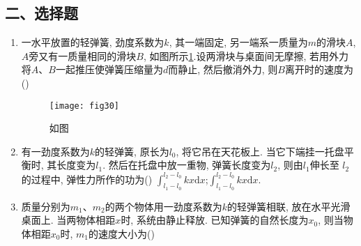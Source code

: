 \subsection*{二、选择题}
\begin{enumerate}
    \item 一水平放置的轻弹簧, 劲度系数为$k$, 其一端固定, 另一端系一质量为$m$的滑块$A$, 
    $A$旁又有一质量相同的滑块$B$, 如图所示\ref{fig:30}.设两滑块与桌面间无摩擦, 若用外力将$A$、$B$一起推压使弹簧压缩量为$d$而静止, 然后撤消外力, 则$B$离开时的速度为(\hspace{1pc})
    \begin{figure}[H]
        \centering
        \texttt{[image: fig30]}
            \caption{如图}\label{fig:30}
    \end{figure}
    \item 有一劲度系数为$k$的轻弹簧, 原长为$l_0$, 将它吊在天花板上. 当它下端挂一托盘平衡时, 其长度变为$l_1$. 然后在托盘中放一重物, 弹簧长度变为$l_2$, 则由$l_1$伸长至
    $l_2$的过程中, 弹性力所作的功为(\hspace{1pc})
    {$\displaystyle{\int_{l_1-l_0}^{l_2-l_0}kx\mathrm{d}x}$;}{$\displaystyle{\int_{l_1-l_0}^{l_2-l_0}kx\mathrm{d}x}$.}
    \item 质量分别为$m_1$、$m_2$的两个物体用一劲度系数为$k$的轻弹簧相联, 放在水平光滑桌面上. 当两物体相距$x$时, 系统由静止释放. 已知弹簧的自然长度为$x_0$, 则当物体相距$x_0$时, $m_1$的速度大小为(\hspace{1pc})

\end{enumerate}
